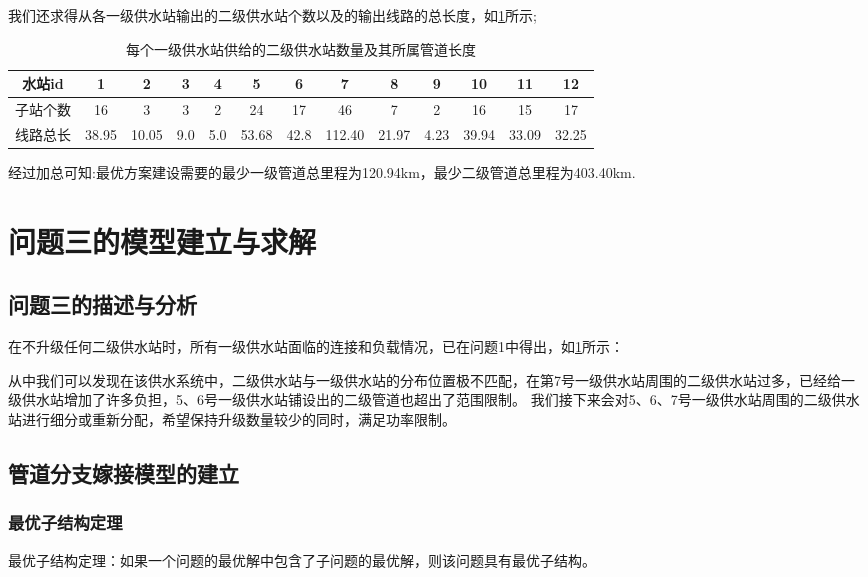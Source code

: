\documentclass{cumcmthesis}
\begin{document}
我们还求得从各一级供水站输出的二级供水站个数以及的输出线路的总长度，如\cref{tab:001}所示;

\begin{table}[!h]
  \caption{每个一级供水站供给的二级供水站数量及其所属管道长度}\label{tab:001} \centering
  \begin{tabular}{ccccccccccccc}
      \toprule[1.5pt]
      水站id & 1 & 2 & 3 & 4 & 5 & 6 & 7 & 8 & 9 & 10 & 11 & 12\\
      \midrule[1pt]
      子站个数&16 & 3 & 3 & 2 & 24 & 17 & 46 & 7 & 2 & 16 & 15 & 17 \\
      线路总长&38.95 & 10.05 & 9.0 & 5.0 & 53.68 & 42.8 & 112.40 & 21.97 & 4.23 & 39.94 & 33.09 &32.25  \\
      \bottomrule[1.5pt]
  \end{tabular}
\end{table}

  经过加总可知:最优方案建设需要的最少一级管道总里程为120.94km，最少二级管道总里程为403.40km.


\section{问题三的模型建立与求解}
\subsection{问题三的描述与分析}
  在不升级任何二级供水站时，所有一级供水站面临的连接和负载情况，已在问题1中得出，如\cref{tab:001}所示：

    从中我们可以发现在该供水系统中，二级供水站与一级供水站的分布位置极不匹配，在第7号一级供水站周围的二级供水站过多，已经给一级供水站增加了许多负担，5、6号一级供水站铺设出的二级管道也超出了范围限制。
    我们接下来会对5、6、7号一级供水站周围的二级供水站进行细分或重新分配，希望保持升级数量较少的同时，满足功率限制。

\subsection{管道分支嫁接模型的建立}
  \subsubsection{最优子结构定理}
    \begin{theorem}
      最优子结构定理：如果一个问题的最优解中包含了子问题的最优解，则该问题具有最优子结构。
      \label{thm:best_sub}
    \end{theorem}
    
\end{document}
